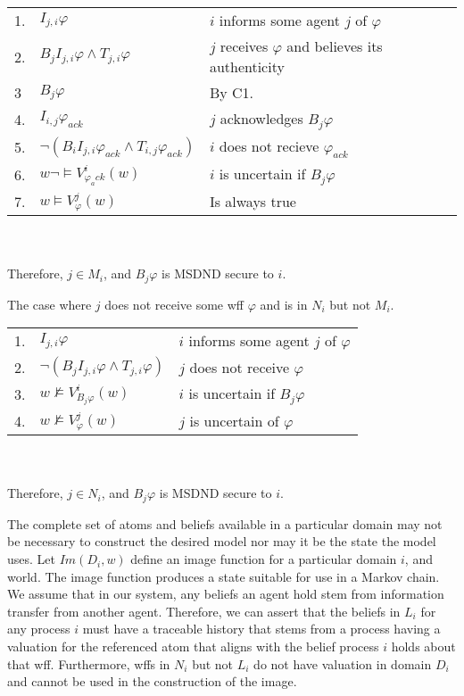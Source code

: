 \begin{table}[h!]
\centering
\small
\begin{tabularx}{\linewidth}{l l X}
1. & $I_{j,i} \varphi$ & $i$ informs some agent $j$ of $\varphi$ \\
2. & $B_{j}I_{j,i} \varphi \wedge T_{j,i} \varphi$ & $j$ receives $\varphi$ and believes its authenticity \\
3  & $B_j \varphi$ & By C1. \\
4. & $I_{i,j} \varphi_{ack}$ & $j$ acknowledges $B_j \varphi$ \\
5. & $\neg(B_{i}I_{j,i} \varphi_{ack} \wedge T_{i,j} \varphi_{ack})$ & $i$ does not recieve $\varphi_{ack}$ \\
6. & $w \neg \vDash V_{\varphi_ack}^{i}(w)$ & $i$ is uncertain if $B_j \varphi$ \\
7. & $w \vDash V_{\varphi}^{j}(w)$ & Is always true %
\end{tabularx} \\~\\
Therefore, $j \in M_i$, and $B_j \varphi$ is MSDND secure to $i$.
\label{tab:msetsecurity}
\end{table}

\begin{case}
The case where $j$ does not receive some wff $\varphi$ and is in $N_i$ but not $M_i$.
\end{case}

\begin{table}[h!]
\centering
\small
\begin{tabularx}{\linewidth}{l l X}
1. & $I_{j,i} \varphi$ & $i$ informs some agent $j$ of $\varphi$ \\
2. & $\neg(B_{j}I_{j,i} \varphi \wedge T_{j,i} \varphi)$ & $j$ does not receive $\varphi$ \\
3. & $w \not \vDash V_{B_j \varphi}^{i}(w)$ & $i$ is uncertain if $B_j \varphi$ \\
4. & $w \not \vDash V_{\varphi}^{j}(w)$ & $j$ is uncertain of $\varphi$ %
\end{tabularx} \\~\\
Therefore, $j \in N_i$, and $B_j \varphi$ is MSDND secure to $i$.
\label{tab:nsetsecurity}
\end{table}


The complete set of atoms and beliefs available in a particular domain may not be necessary to construct the desired model nor may it be the state the model uses. Let $Im(D_i, w)$ define an image function for a particular domain $i$, and world. The image function produces a state suitable for use in a Markov chain. We assume that in our system, any beliefs an agent hold stem from information transfer from another agent. Therefore, we can assert that the beliefs in $L_i$ for any process $i$ must have a traceable history that stems from a process having a valuation for the referenced atom that aligns with the belief process $i$ holds about that wff. Furthermore, wffs in $N_i$ but not $L_i$ do not have valuation in domain $D_i$ and cannot be used in the construction of the image.

